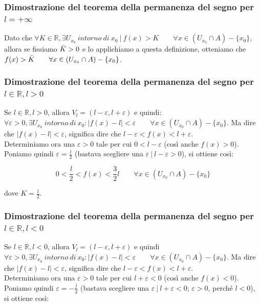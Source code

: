 \documentclass{article}
\begin{document}
\subsubsection{Dimostrazione del teorema della permanenza del segno per $l = +\infty$}
Dato che $\forall K \in \mathbb{R}, \exists U_{x_0} \ intorno \ di \ x_0 \ | \ f(x) > K \qquad \forall x \in (U_{x_0} \cap A) - \{x_0\}$, allora se fissiamo $\Bar{K} > 0$ e lo applichiamo a questa definizione, otteniamo che $f(x) > \Bar{K} \qquad \forall x \in (U_{x_0} \cap A) - \{x_0\}$.

\subsubsection{Dimostrazione del teorema della permanenza del segno per $l \in \mathbb{R}, l > 0$}
Se $l \in \mathbb{R}, l > 0$, allora $V_l = (l - \varepsilon, l + \varepsilon)$ e quindi: $\forall \varepsilon > 0, \exists U_{x_0} \ intorno \ di \ x_0 : |f(x) - l| < \varepsilon \qquad \forall x \in (U_{x_0} \cap A) - \{x_0\}$. Ma dire che $|f(x) - l| < \varepsilon$, significa dire che $l - \varepsilon < f(x) < l + \varepsilon$.\\
Determiniamo ora una $\varepsilon > 0$ tale per cui $0 < l - \varepsilon$ (così anche $f(x) > 0$). Poniamo quindi $\varepsilon = \frac{l}{2}$ (bastava scegliere una $\varepsilon \ | \ l - \varepsilon > 0$), si ottiene così: 

\begin{equation*}
    0 < \frac{l}{2} < f(x) < \frac{3}{2}l \qquad \forall x \in (U_{x_0} \cap A) - \{x_0\}
\end{equation*}

\noindent dove $K = \frac{l}{2}$.

\subsubsection{Dimostrazione del teorema della permanenza del segno per $l \in \mathbb{R}, l < 0$}
Se $l \in \mathbb{R}, l < 0$, allora $V_l = (l - \varepsilon, l + \varepsilon)$ e quindi $\forall \varepsilon > 0, \exists U_{x_0} \ intorno \ di \ x_0 : |f(x) - l| < \varepsilon \qquad \forall x \in (U_{x_0} \cap A) - \{x_0\}$. Ma dire che $|f(x) - l| < \varepsilon$, significa dire che $l - \varepsilon < f(x) < l + \varepsilon$.\\
Determiniamo ora una $\varepsilon > 0$ tale per cui $l + \varepsilon < 0$ (così anche $f(x) < 0$). Poniamo quindi $\varepsilon = -\frac{l}{2}$ (bastava scegliere una $\varepsilon \ | \ l + \varepsilon < 0$; $\varepsilon > 0$, perché $l < 0$), si ottiene così:
\end{document}
